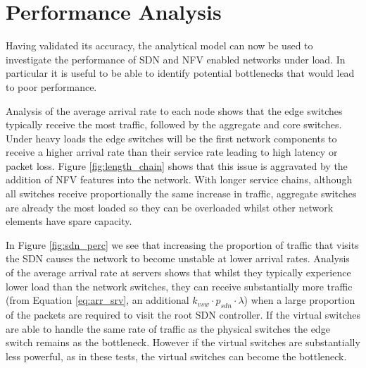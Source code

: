\section{Performance Analysis}
\label{sec:performance}
Having validated its accuracy, the analytical model can now be used to investigate the performance of SDN and NFV enabled networks under load. In particular it is useful to be able to identify potential bottlenecks that would lead to poor performance.

Analysis of the average arrival rate to each node shows that the edge switches typically receive the most traffic, followed by the aggregate and core switches. Under heavy loads the edge switches will be the first network components to receive a higher arrival rate than their service rate leading to high latency or packet loss. Figure \ref{fig:length_chain} shows that this issue is aggravated by the addition of NFV features into the network. With longer service chains, although all switches receive proportionally the same increase in traffic, aggregate switches are already the most loaded so they can be overloaded whilst other network elements have spare capacity.

In Figure \ref{fig:sdn_perc} we see that increasing the proportion of traffic that visits the SDN causes the network to become unstable at lower arrival rates. Analysis of the average arrival rate at servers shows that whilst they typically experience lower load than the network switches, they can receive substantially more traffic (from Equation \ref{eq:arr_srv}, an additional $k_{vsw} \cdot p_{sdn} \cdot \lambda$) when a large proportion of the packets are required to visit the root SDN controller. If the virtual switches are able to handle the same rate of traffic as the physical switches the edge switch remains as the bottleneck. However if the virtual switches are substantially less powerful, as in these tests, the virtual switches can become the bottleneck.